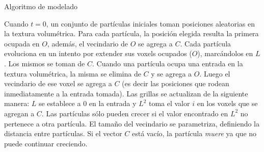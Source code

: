 \begin{algorithm}[h!]
\caption{Algoritmo de modelado}
\begin{algorithmic}


    \EndFor
\EndFor

        \EndIf
                 
                 
            \EndIf
        \EndFor
    \EndFor
\EndFor
\end{algorithmic}
\end{algorithm}

Cuando $t = 0$, un conjunto de part\'iculas iniciales toman posiciones aleatorias en la textura volumétrica.
Para cada partícula, la posici\'on elegida resulta la primera ocupada en $O$, adem\'as, el vecindario de $O$ se agrega a $C$.
Cada part\'icula evoluciona en un intento por extender sus voxels ocupados ($O$), marcándolos en $L$. Los mismos se toman de $C$.
Cuando una part\'icula ocupa una entrada en la textura volumétrica, la misma se elimina de $C$ y se agrega a $O$.
Luego el vecindario de ese voxel se agrega a $C$ (es decir las posiciones que rodean inmediatamente a la entrada tomada).
Las grillas se actualizan de la siguiente manera: $L$ se establece a $0$ en la entrada y $L^{2}$ toma el valor $i$ en los voxels que se agregan a $C$. Las part\'iculas s\'olo pueden crecer si el valor encontrado en $L^{2}$ no pertenece a otra part\'icula.
El tama\~no del vecindario se parametriza, definiendo la distancia entre part\'iculas.
Si el vector $C$ est\'a vac\'io, la part\'icula {\em muere} ya que no puede continuar creciendo.


